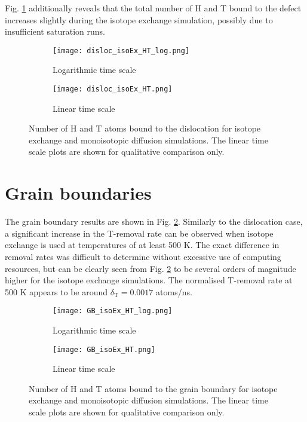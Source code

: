 Fig. \ref{Fig:disloc_results} additionally reveals that the total number of H and T bound to the defect increases slightly during the isotope exchange simulation, possibly due to insufficient saturation runs. 

\vspace{15mm} 

\begin{figure}[!ht]
\begin{subfigure}{.5\textwidth}
  \centering
 \texttt{[image: disloc\_isoEx\_HT\_log.png]}  
  \caption{Logarithmic time scale}
\end{subfigure}
\begin{subfigure}{.5\textwidth}
  \centering
  \texttt{[image: disloc\_isoEx\_HT.png]}  
  \caption{Linear time scale}
\end{subfigure}
   \caption{Number of H and T atoms bound to the dislocation for isotope exchange and monoisotopic diffusion simulations. The linear time scale plots are shown for qualitative comparison only.}
   \label{Fig:disloc_results} 
\end{figure}

\pagebreak

\section{Grain boundaries}
The grain boundary results are shown in Fig. \ref{Fig:GB_results}. 
Similarly to the dislocation case, a significant increase in the T-removal rate can be observed when isotope exchange is used at temperatures of at least 500 K.
The exact difference in removal rates was difficult to determine without excessive use of computing resources, but can be clearly seen from Fig. \ref{Fig:GB_results} to be several orders of magnitude higher for the isotope exchange simulations.
The normalised T-removal rate at 500 K appears to be around $\delta_{\text{T}} = 0.0017$ atoms/ns.

\begin{figure}[!ht]
\begin{subfigure}{.5\textwidth}
  \centering
 \texttt{[image: GB\_isoEx\_HT\_log.png]}  
  \caption{Logarithmic time scale}
\end{subfigure}
\begin{subfigure}{.5\textwidth}
  \centering
  \texttt{[image: GB\_isoEx\_HT.png]}  
  \caption{Linear time scale}
\end{subfigure}
   \caption{Number of H and T atoms bound to the grain boundary for isotope exchange and monoisotopic diffusion simulations. The linear time scale plots are shown for qualitative comparison only.}
   \label{Fig:GB_results} 
\end{figure}


